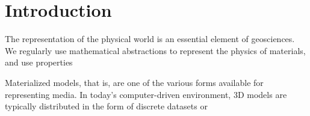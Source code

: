 
\section{Introduction}
\label{sec:introduction}

The representation of the physical world is an essential element of geosciences. We regularly use mathematical abstractions to represent the physics of materials, and use properties 



 Materialized models, that is,  are one of the various forms available for representing media. In today's computer-driven environment, 3D models are typically distributed in the form of discrete datasets or 


%
%
%
